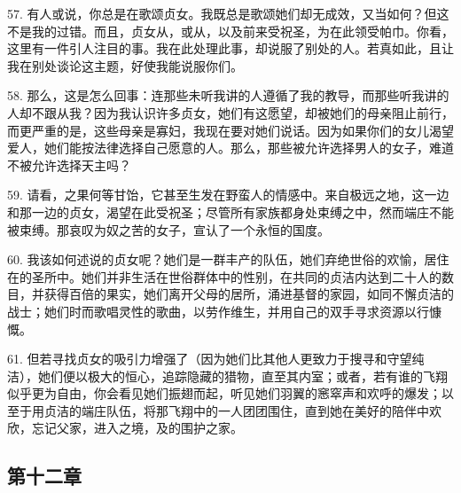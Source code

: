 57. 有人或说，你总是在歌颂贞女。我既总是歌颂她们却无成效，又当如何？但这不是我的过错。而且，贞女从，或从，以及前来受祝圣，为在此领受帕巾。你看，这里有一件引人注目的事。我在此处理此事，却说服了别处的人。若真如此，且让我在别处谈论这主题，好使我能说服你们。\par

58. 那么，这是怎么回事：连那些未听我讲的人遵循了我的教导，而那些听我讲的人却不跟从我？因为我认识许多贞女，她们有这愿望，却被她们的母亲阻止前行，而更严重的是，这些母亲是寡妇，我现在要对她们说话。因为如果你们的女儿渴望爱人，她们能按法律选择自己愿意的人。那么，那些被允许选择男人的女子，难道不被允许选择天主吗？\par

59. 请看，之果何等甘饴，它甚至生发在野蛮人的情感中。来自极远之地，这一边和那一边的贞女，渴望在此受祝圣；尽管所有家族都身处束缚之中，然而端庄不能被束缚。那哀叹为奴之苦的女子，宣认了一个永恒的国度。\par

60. 我该如何述说的贞女呢？她们是一群丰产的队伍，她们弃绝世俗的欢愉，居住在的圣所中。她们并非生活在世俗群体中的性别，在共同的贞洁内达到二十人的数目，并获得百倍的果实，她们离开父母的居所，涌进基督的家园，如同不懈贞洁的战士；她们时而歌唱灵性的歌曲，以劳作维生，并用自己的双手寻求资源以行慷慨。\par

61. 但若寻找贞女的吸引力增强了（因为她们比其他人更致力于搜寻和守望纯洁），她们便以极大的恒心，追踪隐藏的猎物，直至其内室；或者，若有谁的飞翔似乎更为自由，你会看见她们振翅而起，听见她们羽翼的窸窣声和欢呼的爆发；以至于用贞洁的端庄队伍，将那飞翔中的一人团团围住，直到她在美好的陪伴中欢欣，忘记父家，进入之境，及的围护之家。\par


\subsection{第十二章}

\par

